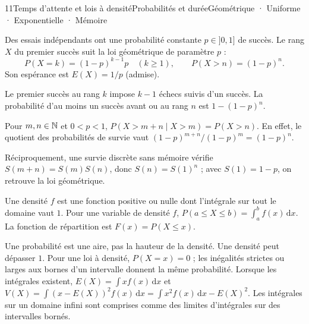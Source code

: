 \begin{ouverture}[sommes]{11}{Temps d’attente et lois à densité}{Probabilités et durée}{Géométrique · Uniforme · Exponentielle · Mémoire}
\end{ouverture}
\essentiel

\begin{definition}
Des essais indépendants ont une probabilité constante $p\in]0,1]$ de succès. Le rang $X$ du premier succès suit la loi géométrique de paramètre $p$ :
\[P(X=k)=(1-p)^{k-1}p\quad(k\geq1),\qquad P(X>n)=(1-p)^n.\]
Son espérance est $E(X)=1/p$ (admise).
\end{definition}
Le premier succès au rang $k$ impose $k-1$ échecs suivis d'un succès. La probabilité d'au moins un succès avant ou au rang $n$ est $1-(1-p)^n$.
\begin{propriete}
Pour $m,n\in\mathbb{N}$ et $0<p<1$,
$P(X>m+n\mid X>m)=P(X>n)$.
En effet, le quotient des probabilités de survie vaut $(1-p)^{m+n}/(1-p)^m=(1-p)^n$.
\end{propriete}
Réciproquement, une survie discrète sans mémoire vérifie $S(m+n)=S(m)S(n)$, donc $S(n)=S(1)^n$ ; avec $S(1)=1-p$, on retrouve la loi géométrique.
\begin{definition}
Une densité $f$ est une fonction positive ou nulle dont l'intégrale sur tout le domaine vaut $1$.
Pour une variable de densité $f$,
$P(a\leq X\leq b)=\int_a^bf(x)\,\mathrm dx$.
La fonction de répartition est $F(x)=P(X\leq x)$.
\end{definition}
Une probabilité est une aire, pas la hauteur de la densité. Une densité peut dépasser $1$. Pour une loi à densité, $P(X=x)=0$ ; les inégalités strictes ou larges aux bornes d'un intervalle donnent la même probabilité.
Lorsque les intégrales existent,
$E(X)=\int xf(x)\,\mathrm dx$ et
$V(X)=\int(x-E(X))^2f(x)\,\mathrm dx=\int x^2f(x)\,\mathrm dx-E(X)^2$.
Les intégrales sur un domaine infini sont comprises comme des limites d'intégrales sur des intervalles bornés.
